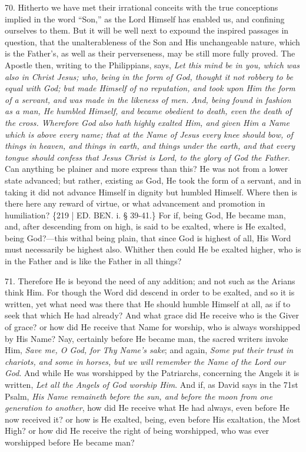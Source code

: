 70. Hitherto we have met their
irrational conceits with the true conceptions implied in the word ``Son,''
as the Lord Himself has enabled us, and confining ourselves to them.
But it will be well next to expound the inspired passages in question,
that the unalterableness of the Son and His unchangeable nature, which
is the Father's, as well as their perverseness, may be still more
fully proved. The Apostle then, writing to the Philippians, says, \emph{Let
this mind be in you, which was also in Christ Jesus; who, being in the
form of God, thought it not robbery to be equal with God; but made
Himself of no reputation, and took upon Him the form of a servant, and
was made in the likeness of men.} \emph{And, being found in fashion as
a man, He humbled Himself, and became obedient to death, even the
death of the cross. Wherefore God also hath highly exalted Him, and
given Him a Name which is above every name; that at the Name of Jesus
every knee should bow, of things in heaven, and things in earth, and
things under the earth, and that every tongue should confess that
Jesus Christ is Lord, to the glory of God the Father}. Can anything
be plainer and more express than this? He was not from a lower state
advanced; but rather, existing as God, He took the form of a servant,
and in taking it did not advance Himself in dignity but humbled
Himself. Where then is there here any reward of virtue, or what
advancement and promotion in humiliation? \{219 | ED. BEN.
i. § 39-41.\} For if, being God, He became man, and, after descending
from on high, is said to be exalted, where is He exalted, being
God?—this withal being plain, that since God is highest of all, His
Word must necessarily be highest also. Whither then could He be
exalted higher, who is in the Father and is like the Father in all
things?

71. Therefore He is beyond the
need of any addition; and not such as the Arians think Him. For though
the Word did descend in order to be exalted, and so it is written, yet
what need was there that He should humble Himself at all, as if to
seek that which He had already? And what grace did He receive who is
the Giver of grace? or how did He receive that Name for worship, who
is always worshipped by His Name? Nay, certainly before He became man,
the sacred writers invoke Him, \emph{Save me, O God, for Thy Name's sake};
and again, \emph{Some put their trust in chariots, and some in horses,
but we will remember the Name of the Lord our God}. And while He
was worshipped by the Patriarchs, concerning the Angels it is written,
\emph{Let all the Angels of God worship Him}. And if, as David says in
the 71st Psalm, \emph{His Name remaineth before the sun, and before the
moon from one generation to another}, how did He receive what He
had always, even before He now received it? or how is He exalted,
being, even before His exaltation, the Most High? or how did He
receive the right of being worshipped, who was ever worshipped before
He became man?

